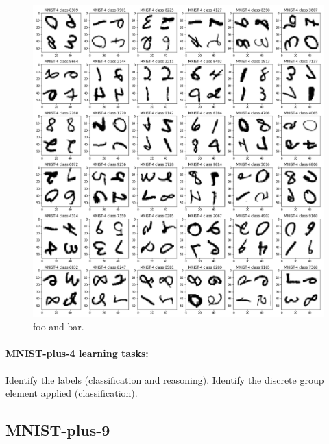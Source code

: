 \documentclass{article}
\begin{document}
\begin{figure}[t!]
\includegraphics[width=\textwidth]{../notebooks/MNIST-4.png}
\caption{foo and bar.\label{fig:4}}
\end{figure}

\paragraph{MNIST-plus-4 learning tasks:} Identify the labels (classification and reasoning). Identify the discrete group element applied (classification).

\subsection{MNIST-plus-9}
\end{document}
